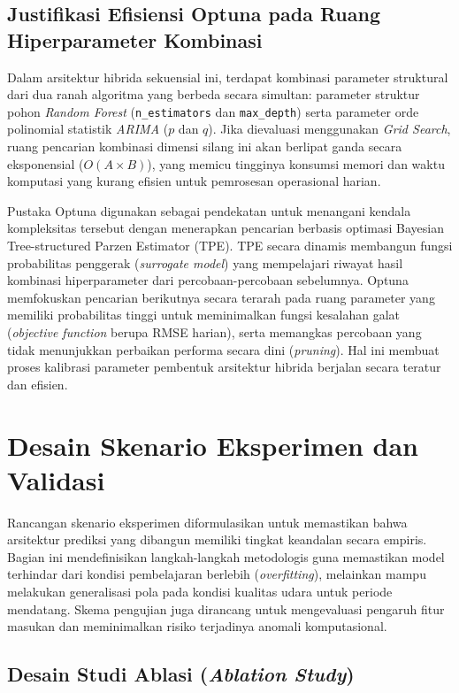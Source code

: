 \subsection{Justifikasi Efisiensi Optuna pada Ruang Hiperparameter Kombinasi}

Dalam arsitektur hibrida sekuensial ini, terdapat kombinasi parameter struktural dari dua ranah algoritma yang berbeda secara simultan: parameter struktur pohon \textit{Random Forest} (\texttt{n\_estimators} dan \texttt{max\_depth}) serta parameter orde polinomial statistik \textit{ARIMA} ($p$ dan $q$). Jika dievaluasi menggunakan \textit{Grid Search}, ruang pencarian kombinasi dimensi silang ini akan berlipat ganda secara eksponensial ($O(A \times B)$), yang memicu tingginya konsumsi memori dan waktu komputasi yang kurang efisien untuk pemrosesan operasional harian.

\newpage

Pustaka Optuna digunakan sebagai pendekatan untuk menangani kendala kompleksitas tersebut dengan menerapkan pencarian berbasis optimasi Bayesian Tree-structured Parzen Estimator (TPE). TPE secara dinamis membangun fungsi probabilitas penggerak (\textit{surrogate model}) yang mempelajari riwayat hasil kombinasi hiperparameter dari percobaan-percobaan sebelumnya. Optuna memfokuskan pencarian berikutnya secara terarah pada ruang parameter yang memiliki probabilitas tinggi untuk meminimalkan fungsi kesalahan galat (\textit{objective function} berupa RMSE harian), serta memangkas percobaan yang tidak menunjukkan perbaikan performa secara dini (\textit{pruning}). Hal ini membuat proses kalibrasi parameter pembentuk arsitektur hibrida berjalan secara teratur dan efisien.

\section{Desain Skenario Eksperimen dan Validasi}

Rancangan skenario eksperimen diformulasikan untuk memastikan bahwa arsitektur prediksi yang dibangun memiliki tingkat keandalan secara empiris. Bagian ini mendefinisikan langkah-langkah metodologis guna memastikan model terhindar dari kondisi pembelajaran berlebih (\textit{overfitting}), melainkan mampu melakukan generalisasi pola pada kondisi kualitas udara untuk periode mendatang. Skema pengujian juga dirancang untuk mengevaluasi pengaruh fitur masukan dan meminimalkan risiko terjadinya anomali komputasional.

\subsection{Desain Studi Ablasi (\textit{Ablation Study})}

